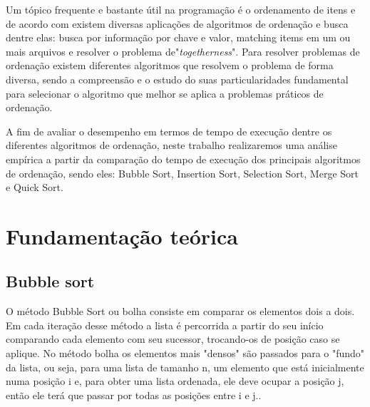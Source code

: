 \documentclass[
	article,			%
	11pt,				%
	oneside,			%
	a4paper,			%
	english,			%
	brazil,				%
	sumario=tradicional
	]{abntex2}
\begin{document}
Um tópico frequente e bastante útil na programação é o ordenamento de itens e de acordo com  existem diversas aplicações de algoritmos de ordenação e busca dentre elas: busca por informação por chave e valor, matching items em um ou mais arquivos e resolver o problema de"\textit{togetherness}". Para resolver problemas de ordenação existem diferentes algoritmos que resolvem o problema de forma diversa, sendo a compreensão e o estudo do suas particularidades fundamental para selecionar o algoritmo que melhor se aplica a problemas práticos de ordenação.

A fim de avaliar o desempenho em termos de tempo de execução dentre os diferentes algoritmos de ordenação, neste trabalho realizaremos uma análise empírica a partir da comparação do tempo de execução dos principais algoritmos de ordenação, sendo eles: Bubble Sort, Insertion Sort, Selection Sort, Merge Sort e Quick Sort.

\section{Fundamentação teórica}


\subsection{Bubble sort}
O método Bubble Sort ou bolha consiste em comparar os elementos dois a dois. Em cada iteração desse método a lista é percorrida a partir do seu início comparando cada elemento com seu sucessor, trocando-os de posição caso se aplique. No método bolha os elementos mais "densos" são passados para o "fundo" da lista, ou seja, para uma lista de tamanho n, um elemento que está inicialmente numa posição i e, para obter uma lista ordenada, ele deve ocupar a posição j, então ele terá que passar por todas as posições entre i e j.\cite{viana2015ordenaccao}.
\end{document}
